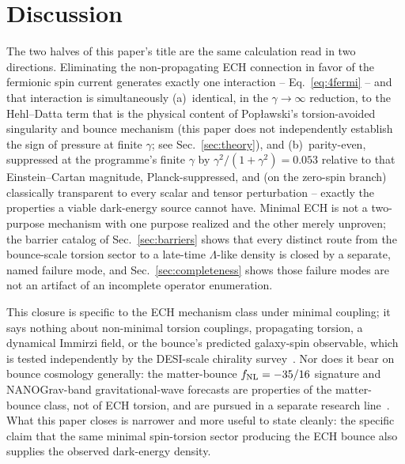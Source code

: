 \documentclass[aps,prd,twocolumn,superscriptaddress,preprintnumbers,nofootinbib,longbibliography,floatfix]{revtex4-2}
\newcommand{\fnl}{f_{\rm NL}}
\begin{document}
\section{Discussion}\label{sec:discussion}

The two halves of this paper's title are the same calculation read in
two directions. Eliminating the non-propagating ECH connection in favor
of the fermionic spin current generates exactly one interaction --
Eq.~\eqref{eq:4fermi} -- and that interaction is simultaneously
(a)~identical, in the $\gamma\to\infty$ reduction, to the Hehl--Datta term
that is the physical content of Pop{\l}awski's torsion-avoided singularity
and bounce mechanism (this paper does not independently establish the
sign of pressure at finite $\gamma$; see Sec.~\ref{sec:theory}), and
(b)~parity-even, suppressed at the programme's
finite $\gamma$ by $\gamma^2/(1+\gamma^2)=0.053$ relative to that
Einstein--Cartan magnitude, Planck-suppressed, and (on the zero-spin
branch) classically transparent to every scalar and tensor perturbation
-- exactly the properties a viable dark-energy source cannot have. Minimal
ECH is not a two-purpose mechanism with one purpose realized and the
other merely unproven; the barrier catalog of Sec.~\ref{sec:barriers}
shows that every distinct route from the bounce-scale torsion sector to a
late-time $\Lambda$-like density is closed by a separate, named failure
mode, and Sec.~\ref{sec:completeness} shows those failure modes are not
an artifact of an incomplete operator enumeration.

This closure is specific to the ECH mechanism class under minimal
coupling; it says nothing about non-minimal torsion couplings,
propagating torsion, a dynamical Immirzi field, or the bounce's
predicted galaxy-spin observable, which is tested independently by the
DESI-scale chirality survey~\cite{Golden2026P4}. Nor does it bear on
bounce cosmology generally: the matter-bounce $\fnl=-35/16$ signature and
NANOGrav-band gravitational-wave forecasts are properties of the
matter-bounce class, not of ECH torsion, and are pursued in a separate
research line~\cite{Golden2026P2}. What this paper closes is narrower and
more useful to state cleanly: the specific claim that the same minimal
spin-torsion sector producing the ECH bounce also supplies the observed
dark-energy density.
\end{document}
